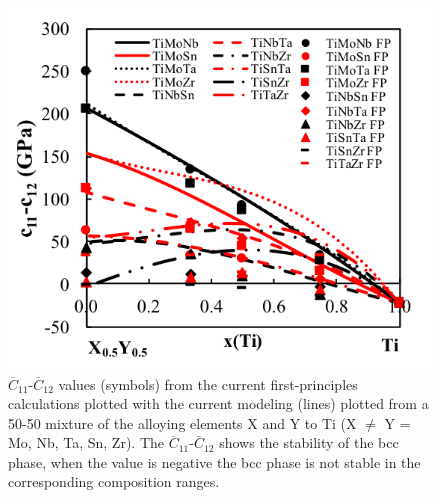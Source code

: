 \pagebreak
\begin{figure}[H]
	\centering
	\includegraphics{Chapter-6/Figures/tixyc11-c12.png}
	\caption{$\overline{C}_{11}$-$\overline{C}_{12}$ values (symbols) from the current first-principles calculations plotted with the current modeling (lines) plotted from a 50-50 mixture of the alloying elements X and Y to Ti (X $\neq$ Y = Mo, Nb, Ta, Sn, Zr). The $\overline{C}_{11}$-$\overline{C}_{12}$ shows the stability of the bcc phase, when the value is negative the bcc phase is not stable in the corresponding composition ranges.}
	\label{Ch6-figure:tixyc11-c12}
\end{figure}

